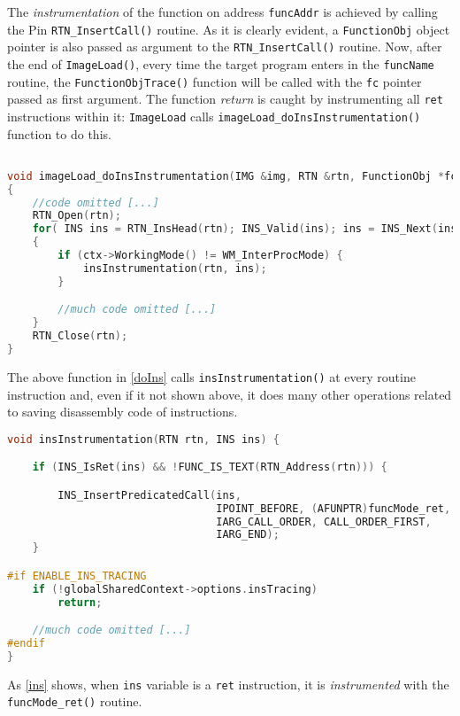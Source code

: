 \documentclass[a4paper,10pt]{report}
\begin{document}
\noindent
The \emph{instrumentation} of the function on address \verb|funcAddr| is achieved
by calling the Pin \verb|RTN_InsertCall()| routine.
As it is clearly evident, a \verb|FunctionObj| object pointer is also passed as
argument to the \verb|RTN_InsertCall()| routine.
Now, after the end of \verb|ImageLoad()|, every time the target program
enters in the \verb|funcName| routine, the \verb|FunctionObjTrace()| function
will be called with the \verb|fc| pointer passed as first argument.
The function \emph{return} is caught by instrumenting all \verb|ret| instructions
within it: \verb|ImageLoad| calls \verb|imageLoad_doInsInstrumentation()| function
to do this.

\begin{lstlisting}[language=C++,
	caption={a fragment of \texttt{imageLoad\_doInsInstrumentation()} routine},
	label=doIns, frame=leftline]

void imageLoad_doInsInstrumentation(IMG &img, RTN &rtn, FunctionObj *fc)
{
	//code omitted [...]
	RTN_Open(rtn);
	for( INS ins = RTN_InsHead(rtn); INS_Valid(ins); ins = INS_Next(ins) )
	{
		if (ctx->WorkingMode() != WM_InterProcMode) {
			insInstrumentation(rtn, ins);
		}

		//much code omitted [...]
	}
	RTN_Close(rtn);
}
\end{lstlisting}

\noindent
The above function in \cref{doIns} calls \verb|insInstrumentation()| at every routine instruction and, even if it not shown above, it does many other operations
related to saving disassembly code of instructions.

\begin{lstlisting}[language=C++,
	caption={a fragment of \texttt{insInstrumentation()} routine},
	label=ins, frame=leftline]
void insInstrumentation(RTN rtn, INS ins) {

	if (INS_IsRet(ins) && !FUNC_IS_TEXT(RTN_Address(rtn))) {

		INS_InsertPredicatedCall(ins,
				                 IPOINT_BEFORE, (AFUNPTR)funcMode_ret,
				                 IARG_CALL_ORDER, CALL_ORDER_FIRST,
				                 IARG_END);
	}

#if ENABLE_INS_TRACING
	if (!globalSharedContext->options.insTracing)
		return;

	//much code omitted [...]
#endif
}

\end{lstlisting}

\noindent
As \cref{ins} shows, when \verb|ins| variable is a \verb|ret| instruction,
it is \emph{instrumented} with the \verb|funcMode_ret()| routine.
\end{document}
